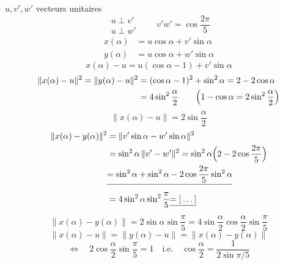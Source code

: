 \documentclass[11pt,a4paper]{article}
\begin{document}
$u, v', w'$ vecteurs unitaires
\[
  \begin{array}{l} u \perp v' \\ u \perp w' \end{array} \qquad v'w' = \cos\frac{2\pi}{5}
\]
\[
\begin{aligned}
  x(\alpha) &= u\cos\alpha + v'\sin\alpha \\
  y(\alpha) &= u\cos\alpha + w'\sin\alpha
\end{aligned}
\]
\[
  x(\alpha) - u = u(\cos\alpha - 1) + v'\sin\alpha
\]
\[
\begin{aligned}
  \|x(\alpha) - u\|^{2} = \|y(\alpha) - u\|^{2} &= (\cos\alpha - 1)^{2} + \sin^{2}\alpha = 2 - 2\cos\alpha \\
  &= 4\sin^{2}\frac{\alpha}{2} \qquad \Bigl(1 - \cos\alpha = 2\sin^{2}\frac{\alpha}{2}\Bigr)
\end{aligned}
\]
\[
  \|x(\alpha) - u\| = 2\sin\frac{\alpha}{2}
\]
\[
\begin{aligned}
  \|x(\alpha) - y(\alpha)\|^{2} &= \|v'\sin\alpha - w'\sin\alpha\|^{2} \\
  &= \sin^{2}\alpha \, \|v' - w'\|^{2} = \sin^{2}\alpha \Bigl(2 - 2\cos\frac{2\pi}{5}\Bigr) \\
  &\struck{= \sin^{2}\alpha + \sin^{2}\alpha - 2\cos\frac{2\pi}{5}\sin^{2}\alpha} \\
  &= 4\sin^{2}\alpha \sin^{2}\frac{\pi}{5} \struck{= \ill{}}
\end{aligned}
\]
\[
  \|x(\alpha) - y(\alpha)\| = 2\sin\alpha \sin\frac{\pi}{5} = 4\sin\frac{\alpha}{2}\cos\frac{\alpha}{2}\sin\frac{\pi}{5}
\]
\[
  \|x(\alpha) - u\| = \|y(\alpha) - u\| = \|x(\alpha) - y(\alpha)\|
\]
\[
  \Longleftrightarrow \quad 2\cos\frac{\alpha}{2}\sin\frac{\pi}{5} = 1 \quad \text{i.e.} \quad \boxed{\cos\frac{\alpha}{2} = \frac{1}{2\sin\pi/5}}
\]
\end{document}
